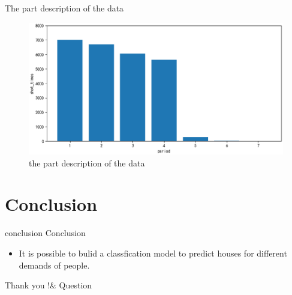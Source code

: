 \documentclass[
 size=14pt,
 paper=smartboard, %
 mode=present, %
 display=slides, %
style=tuliplab,
pauseslide,
fleqn,leqno]{powerdot}
\begin{document}
\begin{slide}{The part description of the data}
	\vspace*{10pt}
	\begin{figure}[htbp]
		\centering
		\includegraphics[scale=0.4]{o.eps}
		\caption{the part description of the data}
	\end{figure}
\end{slide}

\section{Conclusion}
	
\begin{slide}{conclusion}
	Conclusion
	
	\begin{itemize}
		\item  It is possible to bulid a classfication model to predict houses for different demands of people.
	\end{itemize}
\end{slide}
\begin{wideslide}[toc=,bm=]{}
\vspace*{100pt}
\begin{center} 
\hspace*{100pt}	
{\Huge Thank you !\& Question }
\end{center}	
\end{wideslide}
\end{document}
